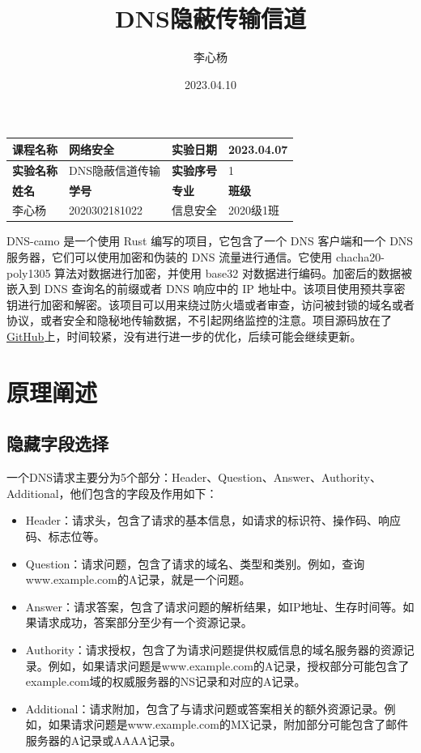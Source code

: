 \documentclass[UTF8]{ctexart}
\title{\textbf{DNS隐蔽传输信道}}
\author{李心杨}
\date{2023.04.10}
\begin{document}
	
	\maketitle
	\begin{table}[H]
    \centering
    \begin{tabular}{|p{2.2cm}<{\centering}|p{5cm}<{\centering}|p{2.8cm}<{\centering}|p{2.5cm}<{\centering}|}
    \hline
    \textbf{课程名称} & 网络安全 & \textbf{实验日期} & 2023.04.07 \\ \hline
    \textbf{实验名称} & DNS隐蔽信道传输 & \textbf{实验序号} & 1 \\ \hline
    \textbf{姓名}   & \textbf{学号}   & \textbf{专业}   & \textbf{班级} \\ \hline
	李心杨 & 2020302181022 & 信息安全 & 2020级1班 \\ \hline
    \end{tabular}
    \end{table}
	\tableofcontents
	\pagebreak

	DNS-camo 是一个使用 Rust 编写的项目，它包含了一个 DNS 客户端和一个 DNS 服务器，它们可以使用加密和伪装的 DNS 流量进行通信。它使用 chacha20-poly1305 算法对数据进行加密，并使用 base32 对数据进行编码。加密后的数据被嵌入到 DNS 查询名的前缀或者 DNS 响应中的 IP 地址中。该项目使用预共享密钥进行加密和解密。该项目可以用来绕过防火墙或者审查，访问被封锁的域名或者协议，或者安全和隐秘地传输数据，不引起网络监控的注意。项目源码放在了 \href{https://github.com/xinyangli/dns-camo}{GitHub}上，时间较紧，没有进行进一步的优化，后续可能会继续更新。

	\section{原理阐述}

	\subsection{隐藏字段选择}

	一个DNS请求主要分为5个部分：Header、Question、Answer、Authority、Additional，他们包含的字段及作用如下：

\begin{itemize}
	\item Header：请求头，包含了请求的基本信息，如请求的标识符、操作码、响应码、标志位等。
	\item Question：请求问题，包含了请求的域名、类型和类别。例如，查询www.example.com的A记录，就是一个问题。
	\item Answer：请求答案，包含了请求问题的解析结果，如IP地址、生存时间等。如果请求成功，答案部分至少有一个资源记录。
	\item Authority：请求授权，包含了为请求问题提供权威信息的域名服务器的资源记录。例如，如果请求问题是www.example.com的A记录，授权部分可能包含了example.com域的权威服务器的NS记录和对应的A记录。
	\item Additional：请求附加，包含了与请求问题或答案相关的额外资源记录。例如，如果请求问题是www.example.com的MX记录，附加部分可能包含了邮件服务器的A记录或AAAA记录。
\end{itemize}
\end{document}
